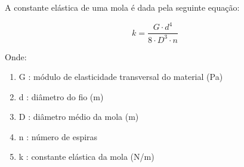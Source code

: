A constante elástica de uma mola é dada pela seguinte equação:

\begin{equation}
    k = \frac{G \cdot d^4}{8 \cdot D^3 \cdot n}
\end{equation}

Onde:

\begin{enumerate}
    \item G : módulo de elasticidade transversal do material (Pa)
    \item d : diâmetro do fio (m)
    \item D : diâmetro médio da mola (m)
    \item n : número de espiras
    \item k : constante elástica da mola (N/m)
\end{enumerate}




